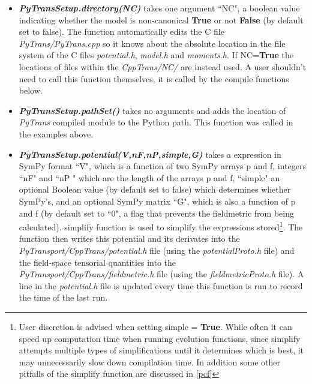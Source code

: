\documentclass[10pt,
amsmath,amssymb,
aps,prd,nofootinbib,eqsecnum,a4paper]{revtex4}
\newcommand{\CC}{C\nolinebreak\hspace{-.05em}\raisebox{.4ex}{\tiny\bf +}\nolinebreak\hspace{-.10em}\raisebox{.4ex}{\tiny\bf +}}
\def\CC{{C\nolinebreak[4]\hspace{-.05em}\raisebox{.4ex}{\tiny\bf ++}}}
\def\S{ }
\begin{document}
\begin{itemize}
\item    {\it \bf PyTransSetup.directory(NC)} takes one argument ``NC", a boolean value indicating whether the model is non-canonical {\color{blue}\bf{True}} or not {\color{blue}\bf{False}} (by default set to false).
The function automatically edits the \CC \S file {\it PyTrans/PyTrans.cpp} so it knows about the absolute location in the file system of the \CC \S files  {\it potential.h}, {\it model.h} and {\it moments.h}. If NC={\color{blue}\bf{True}} the locations of files within the {\it CppTrans/NC/} are instead used. A user shouldn't need to call this function themselves, it is called by the compile functions below.

\item    {\it \bf PyTransSetup.pathSet()} takes no arguments and adds the location of {\it PyTrans} compiled module to the Python path. This function was called in the examples above.


\item    {\it \bf PyTransSetup.potential(V,nF,nP,simple,G)} takes a expression in SymPy format ``V", which is a function of two SymPy arrays p and f, integers ``nF" and ``nP " which are the length of the arrays p and f, ``simple" an optional Boolean value (by default set to false) which determines whether SymPy's, and an optional SymPy matrix ``G", which is also a function of p and f (by default set to ``$0$", a flag that prevents the fieldmetric from being calculated).
simplify function is used to simplify the expressions stored\footnote{User discretion is advised when setting simple = {\color{blue}\bf{True}}. While often it can speed up computation time when running evolution functions, since simplify attempts multiple types of simplifications until it determines which is best, it may unnecessarily slow down compilation time. In addition some other pitfalls of the simplify function are discussed in \ref{pcf}}. The function then writes this potential and its derivates into the {\it PyTransport/CppTrans/potential.h} file (using the {\it potentialProto.h} file) and the field-space tensorial quantities into the {\it PyTransport/CppTrans/fieldmetric.h} file (using the {\it fieldmetricProto.h} file). A line in the {\it potential.h} file is updated every time this function is run to record the 
time of the last run.


\end{itemize}
\end{document}
